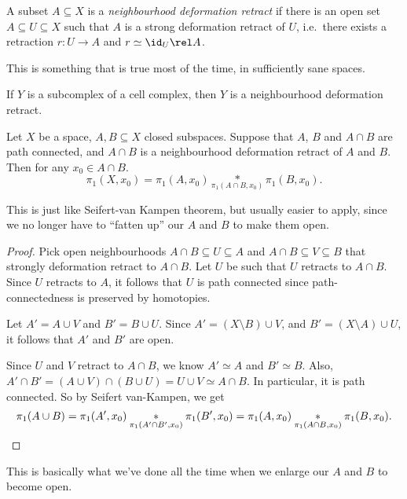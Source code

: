 \documentclass[a4paper]{article}
\begin{document}
\begin{defi}
  A subset $A\subseteq X$ is a \emph{neighbourhood deformation retract} if there is an open set $A\subseteq U\subseteq X$ such that $A$ is a strong deformation retract of $U$, i.e.\ there exists a retraction $r: U \to A$ and $r \simeq \id_U \rel A$.
\end{defi}
This is something that is true most of the time, in sufficiently sane spaces.

\begin{eg}
  If $Y$ is a subcomplex of a cell complex, then $Y$ is a neighbourhood deformation retract.
\end{eg}

\begin{thm}
  Let $X$ be a space, $A, B\subseteq X$ closed subspaces. Suppose that $A$, $B$ and $A\cap B$ are path connected, and $A\cap B$ is a neighbourhood deformation retract of $A$ and $B$. Then for any $x_0 \in A\cap B$.
  \[
    \pi_1(X, x_0) = \pi_1(A, x_0) \underset{\pi_1(A\cap B, x_0)}{*} \pi_1(B, x_0).
  \]
\end{thm}
\begin{center}
\end{center}
This is just like Seifert-van Kampen theorem, but usually easier to apply, since we no longer have to ``fatten up'' our $A$ and $B$ to make them open.

\begin{proof}
  Pick open neighbourhoods $A\cap B \subseteq U \subseteq A$ and $A \cap B \subseteq V \subseteq B$ that strongly deformation retract to $A\cap B$. Let $U$ be such that $U$ retracts to $A \cap B$. Since $U$ retracts to $A$, it follows that $U$ is path connected since path-connectedness is preserved by homotopies.

  Let $A' = A \cup V$ and $B' = B \cup U$. Since $A' = (X \setminus B) \cup V$, and $B' = (X \setminus A) \cup U$, it follows that $A'$ and $B'$ are open.

  Since $U$ and $V$ retract to $A \cap B$, we know $A' \simeq A$ and $B' \simeq B$. Also, $A' \cap B' = (A \cup V) \cap (B \cup U) = U \cup V \simeq A \cap B$. In particular, it is path connected. So by Seifert van-Kampen, we get
  \[
    \pi_1(A \cup B) = \pi_1(A', x_0) \underset{\pi_1(A' \cap B', x_0)}{*} \pi_1(B', x_0) = \pi_1(A, x_0) \underset{\pi_1(A\cap B, x_0)}{*} \pi_1(B, x_0).\qedhere
  \]
\end{proof}
This is basically what we've done all the time when we enlarge our $A$ and $B$ to become open.
\end{document}
